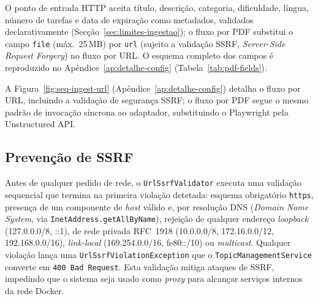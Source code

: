 \begin{table}[h!]
\centering
\caption{Extração de texto por fonte: PDF vs URL}
\label{tab:extracao-comparativa}
\end{table}

O ponto de entrada HTTP aceita título, descrição, categoria, dificuldade, língua, número de tarefas e data de expiração como metadados, validados declarativamente (Secção~\ref{sec:limites-ingestao}); o fluxo por PDF substitui o campo \texttt{file} (máx.\ 25\,MB) por \texttt{url} (sujeito a validação SSRF, \textit{Server-Side Request Forgery}) no fluxo por URL. O esquema completo dos campos é reproduzido no Apêndice~\ref{ap:detalhe-config} (Tabela~\ref{tab:pdf-fields}).

A Figura~\ref{fig:seq-ingest-url} (Apêndice~\ref{ap:detalhe-config}) detalha o fluxo por URL, incluindo a validação de segurança SSRF; o fluxo por PDF segue o mesmo padrão de invocação síncrona ao adaptador, substituindo o Playwright pela Unstructured API.

\subsection*{Prevenção de SSRF}

Antes de qualquer pedido de rede, o \texttt{UrlSsrfValidator} executa uma validação sequencial que termina na primeira violação detetada: esquema obrigatório \texttt{https}, presença de um componente de \textit{host} válido e, por resolução DNS (\textit{Domain Name System}, via \texttt{InetAddress.getAllByName}), rejeição de qualquer endereço \textit{loopback} (127.0.0.0/8, ::1), de rede privada RFC~1918 (10.0.0.0/8, 172.16.0.0/12, 192.168.0.0/16), \textit{link-local} (169.254.0.0/16, fe80::/10) ou \textit{multicast}.
Qualquer violação lança uma \texttt{UrlSsrfViolationException} que o \texttt{TopicManagementService} converte em \texttt{400 Bad Request}.
Esta validação mitiga ataques de SSRF, impedindo que o sistema seja usado como \textit{proxy} para alcançar serviços internos da rede Docker.

